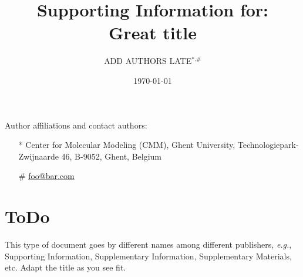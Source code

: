 \documentclass[11pt]{article}
\title{{\normalsize Supporting Information for:}\\[0.5em] Great title}
\author{ADD AUTHORS LATE$^\text{*,\#}$}
\date{\today}
\begin{document}
    \maketitle
    Author affiliations and contact authors:
    \begin{itemize}
        \item[*] Center for Molecular Modeling (CMM), Ghent University, Technologiepark-Zwijnaarde 46, B-9052, Ghent, Belgium
        \item[\#] \href{mailto:foo@bar.com}{foo@bar.com}
    \end{itemize}

    \tableofcontents
    \appendix

    \newpage

    \section{ToDo}
    \label{sec:todo}

    This type of document goes by different names among different publishers,
    \textit{e.g.}, Supporting Information, Supplementary Information, Supplementary Materials, etc.
    Adapt the title as you see fit.
\end{document}
